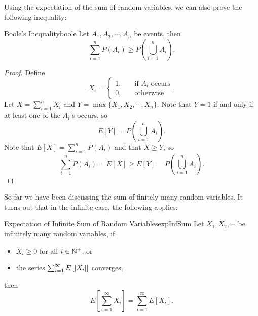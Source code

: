 \documentclass[math]{amznotes}
\theoremstyle{remark}
\begin{document}
Using the expectation of the sum of random variables, we can also prove the following inequality:
\begin{thmbox}{Boole's Inequality}{boole}
    Let $A_1, A_2, \cdots, A_n$ be events, then 
    \begin{equation*}
        \sum_{i = 1}^{n}P(A_i) \geq P\left(\bigcup_{i = 1}^{n}A_i\right).
    \end{equation*}
    \tcblower       
    \begin{proof}
        Define
        \begin{equation*}
            X_i = \begin{cases}
                1, & \quad\textrm{if } A_i \textrm{ occurs} \\
                0, & \quad\textrm{otherwise}
            \end{cases}.
        \end{equation*}
        Let $X = \sum_{i = 1}^{n}X_i$ and $Y = \max\{X_1, X_2, \cdots, X_n\}$. Note that $Y = 1$ if and only if at least one of the $A_i$'s occurs, so 
        \begin{equation*}
            E[Y] = P\left(\bigcup_{i = 1}^{n}A_i\right).
        \end{equation*}
        Note that $E[X] = \sum_{i = 1}^{n}P(A_i)$ and that $X \geq Y$, so
        \begin{equation*}
            \sum_{i = 1}^{n}P(A_i) = E[X] \geq E[Y] = P\left(\bigcup_{i = 1}^{n}A_i\right).
        \end{equation*}
    \end{proof}
\end{thmbox}
So far we have been discussing the sum of finitely many random variables. It turns out that in the infinite case, the following applies:
\begin{thmbox}{Expectation of Infinite Sum of Random Variables}{expInfSum}
    Let $X_1, X_2, \cdots$ be infinitely many random variables, if 
    \begin{itemize}
        \item $X_i \geq 0$ for all $i \in \mathbb{N}^+$, or
        \item the series $\sum_{i = 1}^{\infty}E\left[{\left\lvert {X_i} \right\rvert}\right]$ converges,
    \end{itemize}
    then 
    \begin{equation*}
        E\left[\sum_{i = 1}^{\infty}X_i\right] = \sum_{i = 1}^{\infty}E[X_i].
    \end{equation*}
\end{thmbox}
\end{document}

